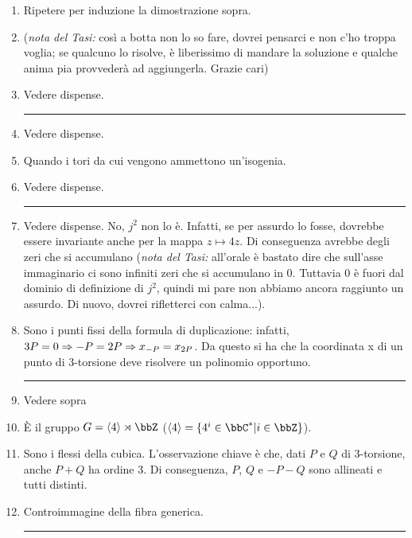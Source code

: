 \begin{enumerate}
\item Ripetere per induzione la dimostrazione sopra.
\item ({\it nota del Tasi:} così a botta non lo so fare, dovrei pensarci e non c'ho troppa voglia; se qualcuno lo risolve, è liberissimo di mandare la soluzione e qualche anima pia provvederà ad aggiungerla. Grazie cari)
\item Vedere dispense.
\bigskip
\hrule
\bigskip

\item Vedere dispense.
\item Quando i tori da cui vengono ammettono un'isogenia.
\item Vedere dispense.
\bigskip
\hrule
\bigskip

\item Vedere dispense. No, $j^2$ non lo è. Infatti, se per assurdo lo fosse, dovrebbe essere invariante anche per la mappa $z\mapsto 4z$. Di conseguenza avrebbe degli zeri che si accumulano ({\it nota del Tasi:} all'orale è bastato dire che sull'asse immaginario ci sono infiniti zeri che si accumulano in 0. Tuttavia 0 è fuori dal dominio di definizione di $j^2$, quindi mi pare non abbiamo ancora raggiunto un assurdo. Di nuovo, dovrei rifletterci con calma...).
\item Sono i punti fissi della formula di duplicazione: infatti, $3P=0 \Rightarrow -P=2P \Rightarrow x_{-P}=x_{2P}$. Da questo si ha che la coordinata x di un punto di 3-torsione deve risolvere un polinomio opportuno. 
\bigskip
\hrule
\bigskip

\item Vedere sopra
\item \`E il gruppo $G=\langle 4\rangle \rtimes \bbZ$ ($\langle 4 \rangle = \{ 4^i \in \bbC^* | i \in \bbZ\}$).
\item Sono i flessi della cubica. L'osservazione chiave è che, dati $P$ e $Q$ di 3-torsione, anche $P+Q$ ha ordine 3. Di conseguenza, $P$, $Q$ e $-P-Q$ sono allineati e tutti distinti.
\item Controimmagine della fibra generica.
\bigskip
\hrule
\bigskip


\end{enumerate}
